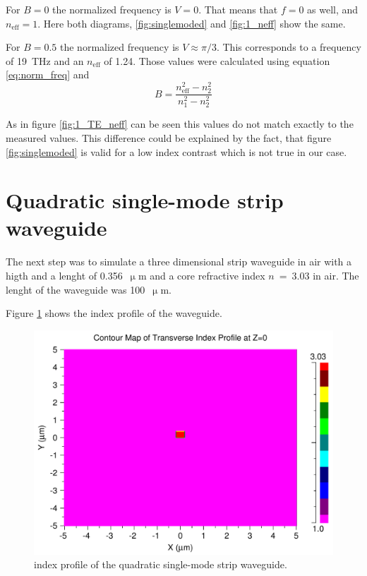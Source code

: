 For $B = 0$ the normalized frequency is $V = 0$. That means that $f = 0$ as well, and $n_{\mathrm{eff}}= 1$. Here both diagrams, \ref{fig:singlemoded} and \ref{fig:1_neff} show the same.

For $B = 0.5$ the normalized frequency is $V\approx\pi/3$.
This corresponds to a frequency of 19~THz and an $n_{\mathrm{eff}}$ of 1.24. 
Those values were calculated using equation \eqref{eq:norm_freq} and 
\begin{equation}
B = \frac{n_{\mathrm{eff}}^2 - n_2^2}{n_1^2-n_2^2}
\label{eq:}
\end{equation}

As in figure \ref{fig:1_TE_neff} can be seen this values do not match exactly to the measured values.
This difference could be explained by the fact, that figure \ref{fig:singlemoded} is valid for a low index contrast which is not true in our case.

\section{Quadratic single-mode strip waveguide}
\label{sec:task2}

The next step was to simulate a three dimensional strip waveguide in air with a higth and a lenght of 0.356~$\upmu$m and a core refractive index $n$~=~3.03 in air.
The lenght of the waveguide was 100~$\upmu$m.

Figure \ref{fig:2_index} shows the index profile of the waveguide.
% 

\begin{figure}[h]%
\centering
\includegraphics[totalheight=5.5 cm]{Grafiken/2_index.pdf}%
\caption{index profile of the quadratic single-mode strip waveguide.}%
\label{fig:2_index}%
\end{figure}

